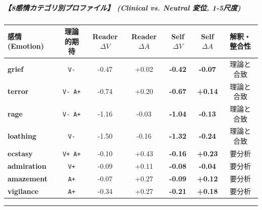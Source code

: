 \subparagraph{【8感情カテゴリ別プロファイル】 (Clinical vs. Neutral 変位, 1-5尺度)}
\begin{center}
\small
\begin{tabular}{lcccccc}
\toprule
\textbf{感情 (Emotion)} & \textbf{理論的期待} & \textbf{Reader $\Delta V$} & \textbf{Reader $\Delta A$} & \textbf{Self $\Delta V$} & \textbf{Self $\Delta A$} & \textbf{解釈・整合性} \\
\midrule
\textbf{grief} & \texttt{V-} & -0.47 & +0.02 & \textbf{-0.42} & \textbf{-0.07} & 理論と合致 \\
\textbf{terror} & \texttt{V- A+} & -0.74 & +0.20 & \textbf{-0.67} & \textbf{+0.14} & 理論と合致 \\
\textbf{rage} & \texttt{V- A+} & -1.16 & -0.03 & \textbf{-1.04} & \textbf{-0.13} & 理論と合致 \\
\textbf{loathing} & \texttt{V-} & -1.50 & -0.16 & \textbf{-1.32} & \textbf{-0.24} & 理論と合致 \\
\textbf{ecstasy} & \texttt{V+ A+} & -0.10 & +0.43 & \textbf{-0.16} & \textbf{+0.23} & 要分析 \\
\textbf{admiration} & \texttt{V+} & -0.09 & +0.11 & \textbf{-0.08} & \textbf{-0.04} & 要分析 \\
\textbf{amazement} & \texttt{A+} & -0.07 & +0.27 & \textbf{-0.09} & \textbf{+0.12} & 要分析 \\
\textbf{vigilance} & \texttt{A+} & -0.34 & +0.27 & \textbf{-0.21} & \textbf{+0.18} & 要分析 \\
\bottomrule
\end{tabular}
\end{center}


\vspace{0.5em}\hrule\vspace{0.5em}
